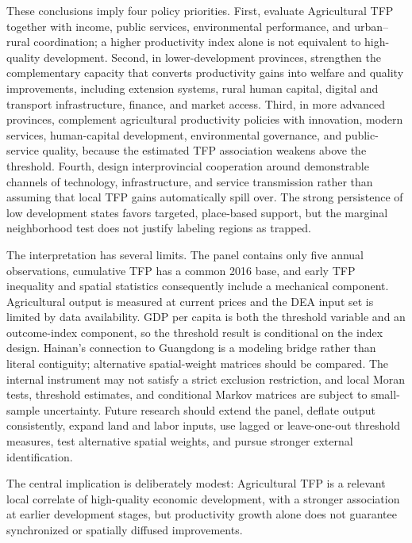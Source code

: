 \documentclass[sustainability,article,submit,moreauthors]{Definitions/mdpi}
\numberwithin{equation}{section}
\begin{document}
These conclusions imply four policy priorities. First, evaluate Agricultural
TFP together with income, public services, environmental performance, and
urban--rural coordination; a higher productivity index alone is not equivalent
to high-quality development. Second, in lower-development provinces,
strengthen the complementary capacity that converts productivity gains into
welfare and quality improvements, including extension systems, rural human
capital, digital and transport infrastructure, finance, and market access.
Third, in more advanced provinces, complement agricultural productivity policies
with innovation, modern services, human-capital development, environmental
governance, and public-service quality, because the estimated TFP association
weakens above the threshold. Fourth, design interprovincial cooperation around
demonstrable channels of technology, infrastructure, and service transmission
rather than assuming that local TFP gains automatically spill over. The strong
persistence of low development states favors targeted, place-based support,
but the marginal neighborhood test does not justify labeling regions as
trapped.

The interpretation has several limits. The panel contains only five annual
observations, cumulative TFP has a common 2016 base, and early TFP inequality
and spatial statistics consequently include a mechanical component. Agricultural
output is measured at current prices and the DEA input set is limited by data
availability. GDP per capita is both the threshold variable and an outcome-index
component, so the threshold result is conditional on the index design. Hainan's
connection to Guangdong is a modeling bridge rather than literal contiguity;
alternative spatial-weight matrices should be compared. The internal instrument
may not satisfy a strict exclusion restriction, and local Moran tests, threshold
estimates, and conditional Markov matrices are subject to small-sample
uncertainty. Future research should extend the panel, deflate output
consistently, expand land and labor inputs, use lagged or leave-one-out
threshold measures, test alternative spatial weights, and pursue stronger
external identification.

The central implication is deliberately modest: Agricultural TFP is a relevant
local correlate of high-quality economic development, with a stronger
association at earlier development stages, but productivity growth alone does
not guarantee synchronized or spatially diffused improvements.
\end{document}
